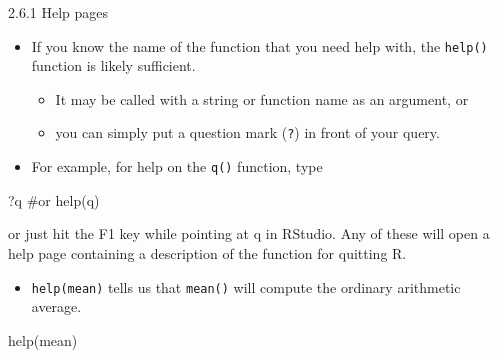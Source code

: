 \documentclass[
  9pt,
  a4paper,
  ignorenonframetext,
  notheorems]{beamer}
\newenvironment{Shaded}{\begin{snugshade}}{\end{snugshade}}
\newcommand{\CommentTok}[1]{\textcolor[rgb]{0.37,0.37,0.37}{#1}}
\newcommand{\FunctionTok}[1]{\textcolor[rgb]{0.28,0.35,0.67}{#1}}
\newcommand{\NormalTok}[1]{\textcolor[rgb]{0.00,0.23,0.31}{#1}}
\providecommand{\tightlist}{%
  \setlength{\itemsep}{0pt}\setlength{\parskip}{0pt}}\usepackage{longtable,booktabs,array}
\begin{document}
\begin{frame}[fragile]{2.6.1 Help pages}
\protect\hypertarget{help-pages}{}
\begin{itemize}
\tightlist
\item
  If you know the name of the function that you need help with, the
  \texttt{help()} function is likely sufficient.

  \begin{itemize}
  \tightlist
  \item
    It may be called with a string or function name as an argument, or
  \item
    you can simply put a question mark (\texttt{?}) in front of your
    query.
  \end{itemize}
\item
  For example, for help on the \texttt{q()} function, type
\end{itemize}

\begin{Shaded}
\begin{Highlighting}[]
\NormalTok{?q }\CommentTok{\#or}
\FunctionTok{help}\NormalTok{(q)}
\end{Highlighting}
\end{Shaded}

or just hit the F1 key while pointing at q in RStudio. Any of these will
open a help page containing a description of the function for quitting
R.

\begin{itemize}
\tightlist
\item
  \texttt{help(mean)} tells us that \texttt{mean()} will compute the
  ordinary arithmetic average.
\end{itemize}

\begin{Shaded}
\begin{Highlighting}[]
\FunctionTok{help}\NormalTok{(mean)}
\end{Highlighting}
\end{Shaded}
\end{frame}
\end{document}

